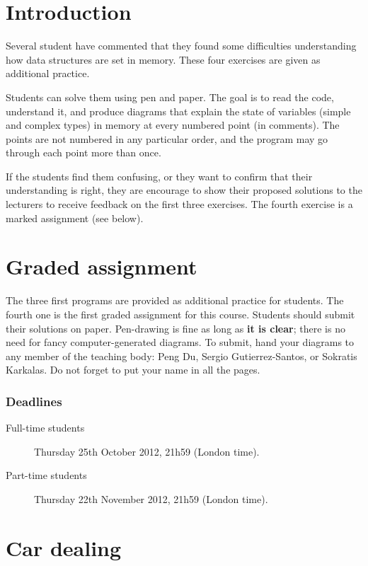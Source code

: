 \documentclass{article}
\begin{document}
\section*{Introduction}
\label{sec:introduction}

Several student have commented that they found some difficulties
understanding how data structures are set in memory. These four
exercises are given as additional practice. 

Students can solve them using pen and paper. The goal is to read
the code, understand it, and produce diagrams that explain the state
of variables (simple and complex types) in memory at every numbered
point (in comments). The points are not numbered in any particular
order, and the program may go through each point more than once. 

If
the students find them confusing, or they want to confirm that their
understanding is right, they are encourage to show their proposed
solutions to the lecturers to receive feedback on the first three
exercises. The fourth exercise is a marked assignment (see below). 

\section*{Graded assignment}
\label{sec:graded-assignment}

The three first programs are provided as additional practice for
students. The fourth one is the first graded assignment for this
course. Students should submit their solutions on paper. Pen-drawing
is fine as long as \textbf{it is clear}; there is no need for fancy
computer-generated diagrams. To submit, hand your diagrams to any
member of the teaching body: Peng Du, Sergio Gutierrez-Santos, or
Sokratis Karkalas. Do not forget to put your name in all the pages. 

\subsubsection*{Deadlines}
\label{sec:deadlines}

\begin{description}
\item[Full-time students] Thursday 25th October 2012, 21h59 (London time). 
\item[Part-time students] Thursday 22th November 2012, 21h59 (London time). 
\end{description}

\section{Car dealing}
\label{sec:car-dealing}
\end{document}

